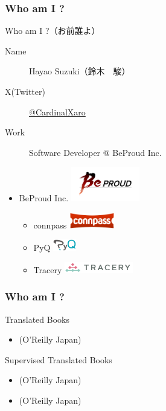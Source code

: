 \documentclass[aspectratio=169,dvipdfmx,14pt,notheorems]{beamer}
\theoremstyle{definition}
\begin{document}
\begin{frame}\frametitle{Who am I ?}

\begin{block}{Who am I ?（お前誰よ）}
\begin{description}
\item[Name] Hayao Suzuki（鈴木　駿）
\item[X(Twitter)] \href{https://twitter.com/CardinalXaro}{@CardinalXaro}
\item[Work] Software Developer @ BeProud Inc.
\end{description}
\end{block}

\begin{center}
\begin{itemize}
\item BeProud Inc. \includegraphics[width=3cm]{bplogo.png}
\begin{itemize}
\item connpass \includegraphics[width=2cm]{connpass_logo_1.png}
\item PyQ \includegraphics[width=1cm]{pyq_logo_color.png}
\item Tracery \includegraphics[width=3cm]{tracery.png}
\end{itemize}
\end{itemize}
\end{center}

\end{frame}

\begin{frame}\frametitle{Who am I ?}

\begin{block}{Translated Books}
\begin{itemize}
\item {}(O'Reilly Japan) 
\end{itemize}
\end{block}

\begin{block}{Supervised Translated Books}
\begin{itemize}
\item {}(O'Reilly Japan)
\item {}(O'Reilly Japan)
\end{itemize}
\end{block}

\end{frame}
\end{document}
